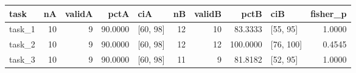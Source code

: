 \begin{tabular}{lrrrlrrrlr}
\toprule
  task &  nA &  validA &    pctA &      ciA &  nB &  validB &     pctB &       ciB &  fisher\_p \\
\midrule
task\_1 &  10 &       9 & 90.0000 & [60, 98] &  12 &      10 &  83.3333 &  [55, 95] &    1.0000 \\
task\_2 &  10 &       9 & 90.0000 & [60, 98] &  12 &      12 & 100.0000 & [76, 100] &    0.4545 \\
task\_3 &  10 &       9 & 90.0000 & [60, 98] &  11 &       9 &  81.8182 &  [52, 95] &    1.0000 \\
\bottomrule
\end{tabular}
